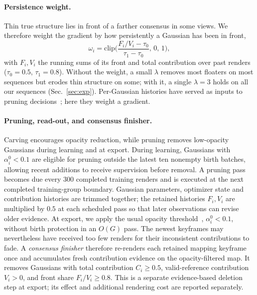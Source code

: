 \paragraph{Persistence weight.}
Thin true structure lies in front of a farther consensus in some views. We therefore weight the gradient by how persistently a Gaussian
has been in front,
\begin{equation}\label{eq:persistence}
  \omega_i=\mathrm{clip}\!\Big(\frac{F_i/V_i-\tau_0}{\tau_1-\tau_0},\,0,\,1\Big),
\end{equation}
with $F_i,V_i$ the running sums of its front and total contribution over past renders ($\tau_0{=}0.5$, $\tau_1{=}0.8$). Without the
weight, a small $\lambda$ removes most floaters on most sequences but erodes thin structure on some; with it, a single $\lambda{=}3$ holds
on all our sequences (Sec.~\ref{sec:exp}). Per-Gaussian histories have served as inputs to pruning decisions~\cite{rtgslam,vingsmono};
here they weight a gradient.

\paragraph{Pruning, read-out, and consensus finisher.}
Carving encourages opacity reduction, while pruning removes low-opacity Gaussians during learning and at export.
During learning, Gaussians with $\alpha_i^0<0.1$ are eligible for pruning outside the latest ten nonempty birth batches, allowing recent additions to receive supervision before removal.
A pruning pass becomes due every 300 completed training renders and is executed at the next completed training-group boundary.
Gaussian parameters, optimizer state and contribution histories are trimmed together; the retained histories $F_i,V_i$ are multiplied by $0.5$ at each scheduled pass so that later observations can revise older evidence.
At export, we apply the usual opacity threshold~\cite{monogs}, $\alpha_i^0<0.1$, without birth protection in an $O(G)$ pass.
The newest keyframes may nevertheless have received too few renders for their inconsistent contributions to fade.
A \emph{consensus finisher} therefore re-renders each retained mapping keyframe once and accumulates fresh contribution evidence on the opacity-filtered map.
It removes Gaussians with total contribution $C_i\ge0.5$, valid-reference contribution $V_i>0$, and front share $F_i/V_i\ge0.8$.
This is a separate evidence-based deletion step at export; its effect and additional rendering cost are reported separately.

